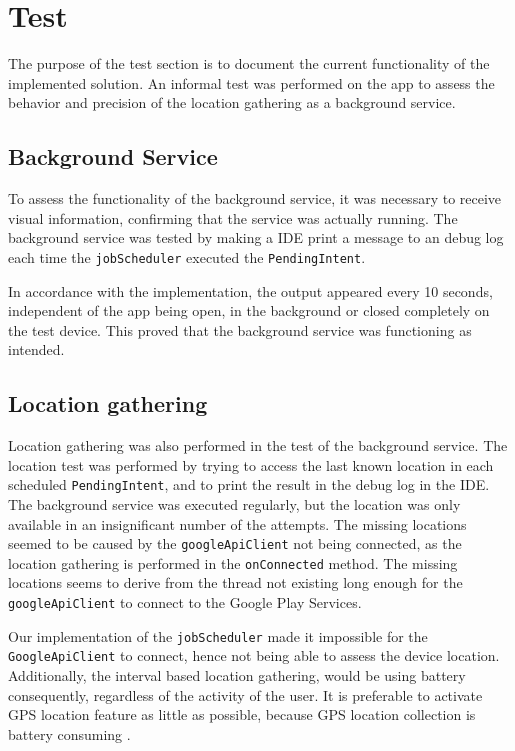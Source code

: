 \section{Test} \label{sec:s2test}
The purpose of the test section is to document the current functionality of the implemented solution.
An informal test was performed on the app to assess the behavior and precision of the location gathering as a background service.

\subsection{Background Service}
To assess the functionality of the background service, it was necessary to receive visual information, confirming that the service was actually running.
The background service was tested by making a IDE print a message to an debug log each time the \texttt{jobScheduler} executed the \texttt{PendingIntent}.

In accordance with the implementation, the output appeared every 10 seconds, independent of the app being open, in the background or closed completely on the test device.
This proved that the background service was functioning as intended.

\subsection{Location gathering} 
Location gathering was also performed in the test of the background service.
The location test was performed by trying to access the last known location in each scheduled \texttt{PendingIntent}, and to print the result in the debug log in the IDE.
The background service was executed regularly, but the location was only available in an insignificant number of the attempts.
The missing locations seemed to be caused by the \texttt{googleApiClient} not being connected, as the location gathering is performed in the \texttt{onConnected} method.
The missing locations seems to derive from the thread not existing long enough for the \texttt{googleApiClient} to connect to the Google Play Services.

Our implementation of the \texttt{jobScheduler} made it impossible for the \texttt{GoogleApiClient} to connect, hence not being able to assess the device location.
Additionally, the interval based location gathering, would be using battery consequently, regardless of the activity of the user. 
It is preferable to activate GPS location feature as little as possible, because GPS location collection is battery consuming \citep{fuckGPS}.